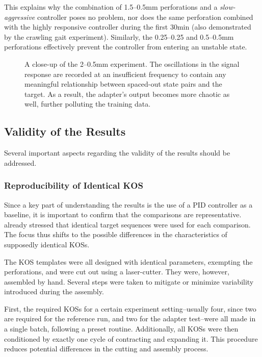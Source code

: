This explains why the combination of 1.5--0.5\si{\mm} perforations and a \emph{slow-aggressive} controller poses no problem, nor does the same perforation combined with the highly responsive controller during the first 30\si{\minute} (also demonstrated by the crawling gait experiment).
Similarly, the 0.25--0.25 and 0.5--0.5\si{\mm} perforations effectively prevent the controller from entering an unstable state.


\begin{figure}
    \centering
    
    \vspace*{-2em}
    \caption{A close-up of the 2--0.5\si{\mm} experiment.
    The oscillations in the signal response are recorded at an insufficient frequency to contain any meaningful relationship between spaced-out state pairs and the target.
    As a result, the adapter's output becomes more chaotic as well, further polluting the training data.}
    \label{fig:limitation}
\end{figure}


\subsection{Validity of the Results}\label{subsec:validity}
Several important aspects regarding the validity of the results should be addressed.

\subsubsection{Reproducibility of Identical KOS}
Since a key part of understanding the results is the use of a PID controller as a baseline, it is important to confirm that the comparisons are representative.
 already stressed that identical target sequences were used for each comparison.
The focus thus shifts to the possible differences in the characteristics of supposedly identical KOSs.

The KOS templates were all designed with identical parameters, exempting the perforations, and were cut out using a laser-cutter.
They were, however, assembled by hand.
Several steps were taken to mitigate or minimize variability introduced during the assembly.

First, the required KOSs for a certain experiment setting--usually four, since two are required for the reference run, and two for the adapter test--were all made in a single batch, following a preset routine.
Additionally, all KOSs were then conditioned by exactly one cycle of contracting and expanding it.
This procedure reduces potential differences in the cutting and assembly process.

